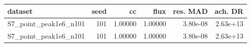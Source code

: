\begin{tabular}{lrrrrr}
\toprule
dataset & seed & cc & flux & res. MAD & ach. DR \\
\midrule
S7\_point\_peak1e6\_n101 & 101 & 1.00000 & 1.00000 & 3.80e-08 & 2.63e+13 \\
S7\_point\_peak1e6\_n101 & 101 & 1.00000 & 1.00000 & 3.80e-08 & 2.63e+13 \\
\bottomrule
\end{tabular}